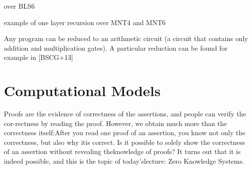 \begin{example}

\end{example}

\begin{example}
over BLS6
\end{example}

\begin{example}
example of one layer recursion over MNT4 and MNT6
\end{example}


\begin{example}

\end{example}

\begin{example}

\end{example}

Any program  can be reduced to  an arithmetic circuit  (a circuit that contains only addition and multiplication gates). A particular reduction can be found for example in [BSCG+13]

\section{Computational Models}
Proofs are the evidence of correctness of the assertions, and people can verify the cor-rectness by reading the proof. However, we obtain much more than the correctness itself:After you read one proof of an assertion, you know not only the correctness, but also why itis correct. Is it possible to solely show the correctness of an assertion without revealing theknowledge of proofs? It turns out that it is indeed possible, and this is the topic of today’slecture: Zero Knowledge Systems.

